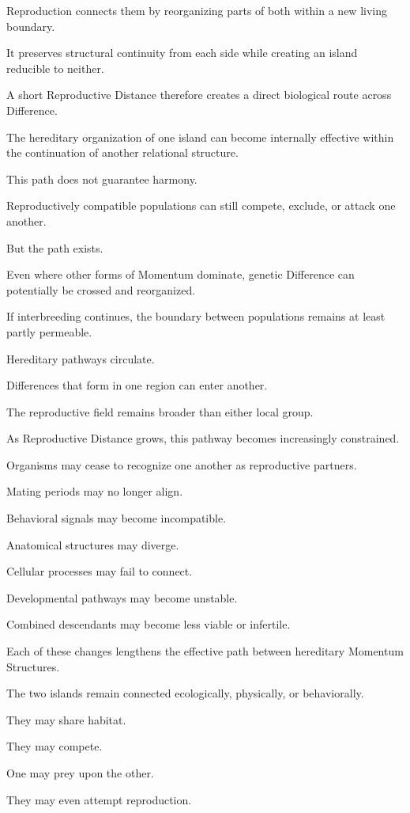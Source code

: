 Reproduction connects them by reorganizing parts of both within a new living boundary.

It preserves structural continuity from each side while creating an island reducible to neither.

A short Reproductive Distance therefore creates a direct biological route across Difference.

The hereditary organization of one island can become internally effective within the continuation of another relational structure.

This path does not guarantee harmony.

Reproductively compatible populations can still compete, exclude, or attack one another.

But the path exists.

Even where other forms of Momentum dominate, genetic Difference can potentially be crossed and reorganized.

If interbreeding continues, the boundary between populations remains at least partly permeable.

Hereditary pathways circulate.

Differences that form in one region can enter another.

The reproductive field remains broader than either local group.

As Reproductive Distance grows, this pathway becomes increasingly constrained.

Organisms may cease to recognize one another as reproductive partners.

Mating periods may no longer align.

Behavioral signals may become incompatible.

Anatomical structures may diverge.

Cellular processes may fail to connect.

Developmental pathways may become unstable.

Combined descendants may become less viable or infertile.

Each of these changes lengthens the effective path between hereditary Momentum Structures.

The two islands remain connected ecologically, physically, or behaviorally.

They may share habitat.

They may compete.

One may prey upon the other.

They may even attempt reproduction.

